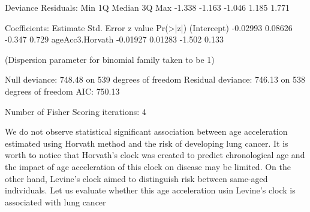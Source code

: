 \documentclass[]{article}
\newcommand{\hlnum}[1]{\textcolor[rgb]{0.816,0.125,0.439}{#1}}%
\newcommand{\hlstr}[1]{\textcolor[rgb]{0.251,0.627,0.251}{#1}}%
\newcommand{\hlopt}[1]{\textcolor[rgb]{0,0,0}{#1}}%
\newcommand{\hlstd}[1]{\textcolor[rgb]{0.251,0.251,0.251}{#1}}%
\newcommand{\hlkwd}[1]{\textcolor[rgb]{0.878,0.439,0.125}{#1}}%
\newenvironment{Shaded}{\begin{myshaded}}{\end{myshaded}}
\newcommand{\KeywordTok}[1]{\hlkwd{#1}}
\newcommand{\DecValTok}[1]{\hlnum{#1}}
\newcommand{\FloatTok}[1]{\hlnum{#1}}
\newcommand{\StringTok}[1]{\hlstr{#1}}
\newcommand{\ControlFlowTok}[1]{\hlkwd{#1}}
\newcommand{\OperatorTok}[1]{\hlopt{#1}}
\newcommand{\ErrorTok}[1]{\textcolor{errorcolor}{#1}}
\newcommand{\NormalTok}[1]{\hlstd{#1}}
\begin{document}
\begin{Shaded}
\begin{Highlighting}[]
\NormalTok{  Deviance Residuals}\OperatorTok{:}\StringTok{ }
\StringTok{     }\NormalTok{Min      1Q  Median      3Q     Max  }
  \FloatTok{-1.338}  \FloatTok{-1.163}  \FloatTok{-1.046}   \FloatTok{1.185}   \FloatTok{1.771}  
  
\NormalTok{  Coefficients}\OperatorTok{:}
\StringTok{                  }\NormalTok{Estimate Std. Error z value }\KeywordTok{Pr}\NormalTok{(}\OperatorTok{>}\ErrorTok{|}\NormalTok{z}\OperatorTok{|}\NormalTok{)}
\NormalTok{  (Intercept)     }\FloatTok{-0.02993}    \FloatTok{0.08626}  \FloatTok{-0.347}    \FloatTok{0.729}
\NormalTok{  ageAcc3.Horvath }\FloatTok{-0.01927}    \FloatTok{0.01283}  \FloatTok{-1.502}    \FloatTok{0.133}
  
\NormalTok{  (Dispersion parameter }\ControlFlowTok{for}\NormalTok{ binomial family taken to be }\DecValTok{1}\NormalTok{)}
  
\NormalTok{      Null deviance}\OperatorTok{:}\StringTok{ }\FloatTok{748.48}\NormalTok{  on }\DecValTok{539}\NormalTok{  degrees of freedom}
\NormalTok{  Residual deviance}\OperatorTok{:}\StringTok{ }\FloatTok{746.13}\NormalTok{  on }\DecValTok{538}\NormalTok{  degrees of freedom}
\NormalTok{  AIC}\OperatorTok{:}\StringTok{ }\FloatTok{750.13}
  
\NormalTok{  Number of Fisher Scoring iterations}\OperatorTok{:}\StringTok{ }\DecValTok{4}
\end{Highlighting}
\end{Shaded}

We do not observe statistical significant association between age acceleration estimated using Horvath method and the risk of developing lung cancer. It is worth to notice that Horvath's clock was created to predict chronological age and the impact of age acceleration of this clock on disease may be limited. On the other hand, Levine's clock aimed to distinguish risk between same-aged individuals. Let us evaluate whether this age acceleration usin Levine's clock is associated with lung cancer
\end{document}
